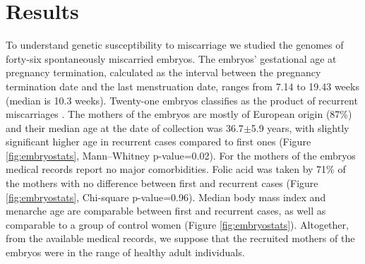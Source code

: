 \section*{Results}


To understand genetic susceptibility to miscarriage we studied the genomes of forty-six spontaneously miscarried embryos. The embryos' gestational age at pregnancy termination, calculated as the interval between the pregnancy termination date and the last menstruation date, ranges from 7.14 to 19.43 weeks (median is 10.3 weeks). Twenty-one embryos classifies as the product of recurrent miscarriages \cite{eshre2018eshre}. The mothers of the embryos are mostly of European origin (87\%) and their median age at the date of collection was 36.7$\pm$5.9 years, with slightly significant higher age in recurrent cases compared to first ones (Figure \ref{fig:embryostats}, Mann–Whitney p-value=0.02). For the mothers of the embryos medical records report no major comorbidities. Folic acid was taken by 71\% of the mothers with no difference between first and recurrent cases (Figure \ref{fig:embryostats}, Chi-square p-value=0.96). Median body mass index and menarche age are comparable between first and recurrent cases, as well as comparable to a group of control women (Figure \ref{fig:embryostats}). Altogether, from the available medical records, we suppose that the recruited mothers of the embryos were in the range of healthy adult individuals. %

